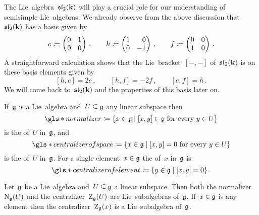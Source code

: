 \begin{remark}
  The Lie~algebra~$\mathfrak{sl}_2(\mathbf{k})$ will play a crucial role for our understanding of semisimple Lie~algebras.
  We already observe from the above discussion that~$\mathfrak{sl}_2(\mathbf{k})$ has a basis given by
  \[
    e
    \defined
    \begin{pmatrix}
      0 & 1 \\
      0 & 0
    \end{pmatrix} \,,
    \qquad
    h
    \defined
    \begin{pmatrix*}[r]
      1 &  0  \\
      0 & -1
    \end{pmatrix*}  \,,
    \qquad
    f
    \defined
    \begin{pmatrix}
      0 & 0 \\
      1 & 0
    \end{pmatrix} \,.
  \]
  A straightforward calculation shows that the Lie~bracket~$[-,-]$ of~$\mathfrak{sl}_2(\mathbf{k})$ is on these basis elements given by
  \[
    [h, e]
    =
    2e  \,,
    \qquad
    [h, f]
    =
    -2f \,,
    \qquad
    [e,f]
    =
    h \,.
  \]
  We will come back to~$\mathfrak{sl}_2(\mathbf{k})$ and the properties of this basis later on.
\end{remark}


\begin{definition}
  If~$\mathfrak{g}$ is a Lie~algebra and~$U \subseteq \mathfrak{g}$ any linear subspace then
  \[
    \gls*{normalizer}
    \defined
    \{
      x \in \glie
    \suchthat
      \text{$[x,y] \in \glie$ for every~$y \in U$}
    \}
  \]
  is the  of~$U$ in~$\mathfrak{g}$, and
  \[
    \gls*{centralizer of space}
    \defined
    \{
      x \in \glie
    \suchthat
      \text{$[x,y] = 0$ for every $y \in U$}
    \}
  \]
  is the  of~$U$ in~$\mathfrak{g}$.
  For a single element~$x \in \mathfrak{g}$ the  of~$x$ in~$\mathfrak{g}$ is
  \[
    \gls*{centralizer of element}
    \defined
    \{
      y \in \glie
    \suchthat
      [x,y] = 0
    \} \,.
  \]
\end{definition}


\begin{lemma}
 Let~$\mathfrak{g}$ be a Lie~algebra and~$U \subseteq \mathfrak{g}$ a linear subspace.
 Then both the normalizer~$\operatorname{N}_{\mathfrak{g}}(U)$ and the centralizer~$\operatorname{Z}_{\mathfrak{g}}(U)$ are Lie~subalgebras of~$\mathfrak{g}$.
 If~$x \in \mathfrak{g}$ is any element then the centralizer~$\operatorname{Z}_{\mathfrak{g}}(x)$ is a Lie~subalgebra of~$\mathfrak{g}$.
\end{lemma}


